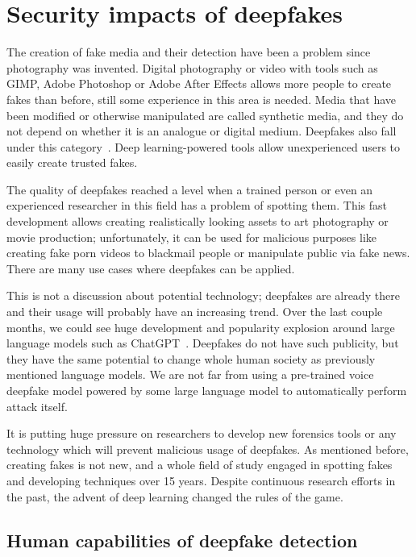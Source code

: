 \chapter{Security impacts of deepfakes}

The creation of fake media and their detection have been a problem since photography was invented. Digital photography or video with tools such as GIMP, Adobe Photoshop or Adobe After Effects allows more people to create fakes than before, still some experience in this area is needed. Media that have been modified or otherwise manipulated are called synthetic media, and they do not depend on whether it is an analogue or digital medium. Deepfakes also fall under this category~\cite{IncreasingThreatofDeepfakeIdentites}. Deep learning-powered tools allow unexperienced users to easily create trusted fakes. 

The quality of deepfakes reached a level when a trained person or even an experienced researcher in this field has a problem of spotting them. This fast development allows creating realistically looking assets to art photography or movie production; unfortunately, it can be used for malicious purposes like creating fake porn videos to blackmail people or manipulate public via fake news. There are many use cases where deepfakes can be applied.

This is not a discussion about potential technology; deepfakes are already there and their usage will probably have an increasing trend. Over the last couple months, we could see huge development and popularity explosion around large language models such as ChatGPT~\cite{ ChatGPTPopularity}. Deepfakes do not have such publicity, but they have the same potential to change whole human society as previously mentioned language models. We are not far from using a pre-trained voice deepfake model powered by some large language model to automatically perform attack itself.

It is putting huge pressure on researchers to develop new forensics tools or any technology which will prevent malicious usage of deepfakes. As mentioned before, creating fakes is not new, and a whole field of study engaged in spotting fakes and developing techniques over 15 years. Despite continuous research efforts in the past, the advent of deep learning changed the rules of the game.~\cite{MediaForensicsandDeepFakes}

\section{Human capabilities of deepfake detection}

